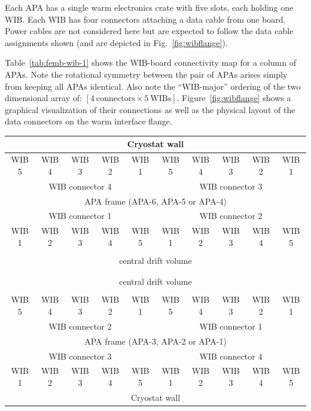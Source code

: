 \documentclass[pdftex,12pt,letter]{article}
\begin{document}
Each APA has a single warm electronics crate with five slots, each
holding one WIB.  Each WIB has four connectors attaching a data cable
from one board.  Power cables are not considered here but are expected
to follow the data cable assignments shown (and are depicted in Fig.~\ref{fig:wibflange}).

Table~\ref{tab:femb-wib-1} shows the WIB-board connectivity map for a
column of APAs.  Note the rotational symmetry between the pair of APAs
arises simply from keeping
all APAs identical.  Also note the ``WIB-major'' ordering of the two
dimensional array of: $[4\ \mbox{connectors} \times 5\ \mbox{WIBs}]$.
Figure~\ref{fig:wibflange} shows a graphical visualization of their
connections as well as the physical layout of the data connectors on
the warm interface flange.

\begin{table}[htp]
  \centering
  \begin{tabular}[h]{|c|c|c|c|c|c|c|c|c|c|}
    \hline
    \multicolumn{10}{|c|}{Cryostat wall} \\
    \hline
    WIB 5 & WIB 4 & WIB 3 & WIB 2 & WIB 1 & WIB 5 & WIB 4 & WIB 3 & WIB 2 & WIB 1 \\
    \multicolumn{5}{|c|}{WIB connector 4} & \multicolumn{5}{c|}{WIB connector 3} \\
    \hline
    \multicolumn{10}{|c|}{APA frame (APA-6, APA-5 or APA-4)} \\
    \hline
    \multicolumn{5}{|c|}{WIB connector 1} & \multicolumn{5}{c|}{WIB connector 2} \\
    WIB 1 & WIB 2 & WIB 3 & WIB 4 & WIB 5 & WIB 1 & WIB 2 & WIB 3 & WIB 4 & WIB 5\\
    \hline
    \multicolumn{10}{|c|}{} \\
    \multicolumn{10}{|c|}{central drift volume} \\
    \multicolumn{10}{|c|}{} \\
    \hline
    \hline
    \hline
    \multicolumn{10}{|c|}{} \\
    \multicolumn{10}{|c|}{central drift volume} \\
    \multicolumn{10}{|c|}{} \\
    \hline
    WIB 5 & WIB 4 & WIB 3 & WIB 2 & WIB 1 & WIB 5 & WIB 4 & WIB 3 & WIB 2 & WIB 1\\
    \multicolumn{5}{|c|}{WIB connector 2} & \multicolumn{5}{c|}{WIB connector 1} \\
    \hline
    \multicolumn{10}{|c|}{APA frame (APA-3, APA-2 or APA-1)} \\
    \hline
    \multicolumn{5}{|c|}{WIB connector 3} & \multicolumn{5}{c|}{WIB connector 4} \\
    WIB 1 & WIB 2 & WIB 3 & WIB 4 & WIB 5 & WIB 1 & WIB 2 & WIB 3 & WIB 4 & WIB 5\\
    \hline
    \multicolumn{10}{|c|}{Cryostat wall} \\
    \hline



\end{tabular}
\end{table}
\end{document}
